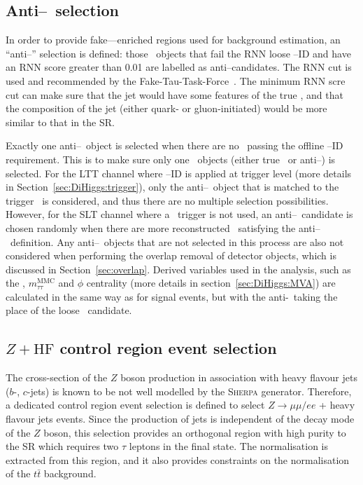 \subsection{Anti--\tauhad\ selection}


\label{sec:antitau-selection}
In order to provide fake--\tauhad--enriched regions used for background estimation, 
an ``anti--\tauhad'' selection is defined:
those \tauhadvis\ objects that fail the RNN loose \tauhad--ID 
and have an RNN score greater than 0.01 are labelled as anti--\tauhad candidates. 
The RNN cut is used and recommended by the Fake-Tau-Task-Force~\cite{fttf-twiki}.
The minimum RNN scre cut can make sure that 
the jet would have some features of the true \tauhad, and that 
the composition of the jet (either quark- or gluon-initiated) would 
be more similar to that in the SR. 

Exactly one anti--\tauhad\ object is selected when there are no \tauhad\
passing the offline \tauhad--ID requirement. 
This is to make sure only one \tauhad\ objects (either true \tauhad\ or
anti--\tauhad) is selected.
For the LTT channel where \tauhad--ID is applied at trigger level 
(more details in Section~\ref{sec:DiHiggs:trigger}),
only the anti--\tauhad\ object that is matched to the
trigger \tauhad\ is considered, and thus there are 
no multiple selection possibilities. 
However, for the SLT channel where a \tauhad\ trigger is not used, 
an anti--\tauhad\ candidate is chosen randomly 
when there are more reconstructed
\tauhad\ satisfying the anti--\tauhad\ definition. 
Any anti--\tauhad\ objects that are not selected in this process are also not
considered when performing the overlap removal of detector objects, 
which is discussed in Section~\ref{sec:overlap}.
Derived variables used in the analysis, such as the 
\MET, $m^{\mathrm{MMC}}_{\tau\tau}$ and \MET$\phi$ centrality
(more details in section~\ref{sec:DiHiggs:MVA})
are calculated in the same way as for signal events, 
but with the anti-\tauhad\ taking the place of the loose \tauhad\ candidate.


\subsection{$Z+\text{HF}$ control region event selection}
\label{sec:selection:zcr}


The cross-section of the $Z$ boson production in association 
with heavy flavour jets ($b$-, $c$-jets) is known to be 
not well modelled by the \textsc{Sherpa} generator. 
Therefore, a dedicated control region event selection is defined
to select $Z \rightarrow \mu \mu / e e$ + heavy flavour jets events. 
Since the production of jets is independent of the decay mode 
of the $Z$ boson, this selection provides an orthogonal region with 
high purity to the SR which requires two $\tau$ leptons in the final state.  
The normalisation is extracted from this region,
and it also provides constraints 
on the normalisation of the $t\bar t$ background. 

